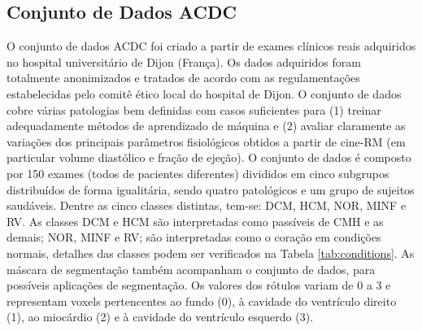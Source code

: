 \subsection{Conjunto de Dados ACDC} 
\label{subsec:cap4_acdc}

O conjunto de dados \gls{ACDC} foi criado a partir de exames clínicos reais adquiridos no hospital universitário de Dijon (França). Os dados adquiridos foram totalmente anonimizados e tratados de acordo com as regulamentações estabelecidas pelo comitê ético local do hospital de Dijon. O conjunto de dados cobre várias patologias bem definidas com casos suficientes para (1) treinar adequadamente métodos de aprendizado de máquina e (2) avaliar claramente as variações dos principais parâmetros fisiológicos obtidos a partir de cine-RM (em particular volume diastólico e fração de ejeção). O conjunto de dados é composto por 150 exames (todos de pacientes diferentes) divididos em cinco subgrupos distribuídos de forma igualitária, sendo quatro patológicos e um grupo de sujeitos saudáveis. Dentre as cinco classes distintas, tem-se: \gls{DCM}, \gls{HCM}, \gls{NOR}, \gls{MINF} e \gls{RV}. As classes \gls{DCM} e \gls{HCM} são interpretadas como passíveis de \gls{CMH} e as demais; \gls{NOR}, \gls{MINF} e \gls{RV}; são interpretadas como o coração em condições normais, detalhes das classes podem ser verificados na Tabela \ref{tab:conditions}. As máscara de segmentação também acompanham o conjunto de dados, para possíveis aplicações de segmentação. Os valores dos rótulos variam de 0 a 3 e representam voxels pertencentes ao fundo (0), à cavidade do ventrículo direito (1), ao miocárdio (2) e à cavidade do ventrículo esquerdo (3).

